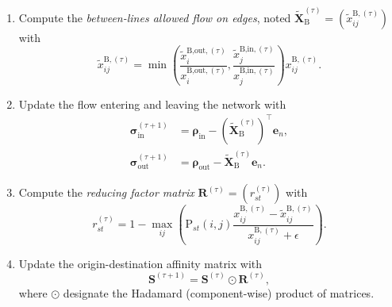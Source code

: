 \documentclass[11p]{article}
\begin{document}
\begin{enumerate}
	\item Compute the \emph{between-lines allowed flow on edges}, noted $\widetilde{\mathbf{X}}_\text{B}^{(\tau)} = (\widetilde{x}_{ij}^{\text{B},(\tau)})$ with 
	\begin{equation}
		\widetilde{x}_{ij}^{\text{B},(\tau)} = \min \left( \frac{\tilde{x}^{\text{B,out},(\tau)}_i}{x^{\text{B,out},(\tau)}_i} , \frac{\tilde{x}^{\text{B,in},(\tau)}_j}{x^{\text{B,in},(\tau)}_j} \right)  x^{\text{B},(\tau)}_{ij}.
	\end{equation}
	\item Update the flow entering and leaving the network with
		\begin{align}
			\bm{\sigma}^{(\tau+1)}_\text{in} &= \bm{\rho}_\text{in} -  (\widetilde{\mathbf{X}}^{(\tau)}_\text{B})^\top \mathbf{e}_n, \\
			\bm{\sigma}^{(\tau+1)}_\text{out} &= \bm{\rho}_\text{out} -  \widetilde{\mathbf{X}}^{(\tau)}_\text{B} \mathbf{e}_n.
		\end{align}
	\item Compute the \emph{reducing factor matrix} $\mathbf{R}^{(\tau)} = (r^{(\tau)}_{st})$ with 
	\begin{equation}
		r^{(\tau)}_{st} = 1 - \max_{ij} \left( \text{P}_{st}(i, j) \frac{x_{ij}^{\text{B},(\tau)}  - \widetilde{x}_{ij}^{\text{B},(\tau)}}{x_{ij}^{\text{B},(\tau)} + \epsilon} \right).
	\end{equation}
	\item Update the origin-destination affinity matrix with
	\begin{equation}
		\mathbf{S}^{(\tau + 1)} = \mathbf{S}^{(\tau)} \odot \mathbf{R}^{(\tau)},
	\end{equation}
	where $\odot$ designate the Hadamard (component-wise) product of matrices. 
\end{enumerate}
\end{document}
